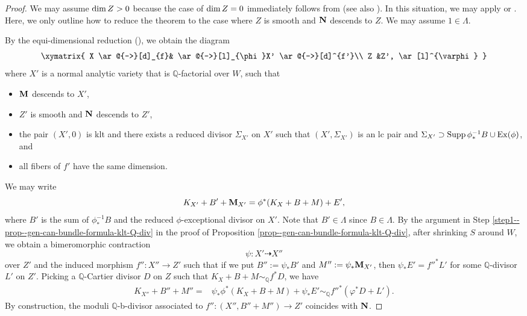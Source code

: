 \documentclass[12pt]{amsart}
\theoremstyle{definition}
\begin{document}
\begin{proof}
We may assume ${\rm dim}\,Z>0$ because the case of ${\rm dim}\,Z=0$ immediately follows from \cite[Theorem 1.2]{filipazzi-moraga} (see also \cite[Theorem 1.10]{birkar-compl}). 
In this situation, we may apply \cite[Proof of Proposition 6.3]{birkar-compl} or \cite[Section 5]{filipazzi-moraga}.  
Here, we only outline how to reduce the theorem to the case where $Z$ is smooth and $\boldsymbol{\rm N}$ descends to $Z$. 
We may assume $1 \in \Lambda$. 

By the equi-dimensional reduction (\cite{eh-semistablereduction}), we obtain the diagram
 $$
\xymatrix{
X \ar@{->}[d]_{f}& \ar@{->}[l]_{\phi}X' \ar@{->}[d]^{f'}\\
Z &Z', \ar[l]^{\varphi}
}
$$
where $X'$ is a normal analytic variety that is $\mathbb{Q}$-factorial over $W$, such that
\begin{itemize}
\item
$\boldsymbol{\rm M}$ descends to $X'$,
\item
$Z'$ is smooth and $\boldsymbol{\rm N}$ descends to $Z'$, 
\item
 the pair $(X',0)$ is klt and there exists a reduced divisor $\Sigma_{X'}$ on $X'$ such that  $(X',\Sigma_{X'})$ is an lc pair and $\Sigma_{X'}\supset {\rm Supp}\,\phi^{-1}_{*}B\cup {\rm Ex}(\phi)$, and
\item
all fibers of $f'$ have the same dimension. 
\end{itemize}
We may write
$$K_{X'}+B'+\boldsymbol{\rm M}_{X'}=\phi^{*}(K_{X}+B+M)+E',$$
where $B'$ is the sum of $\phi^{-1}_{*}B$ and the reduced $\phi$-exceptional divisor on $X'$. 
Note that $B' \in \Lambda$ since $B \in \Lambda$. 
By the argument in Step \ref{step1--prop--gen-can-bundle-formula-klt-Q-div} in the proof of Proposition \ref{prop--gen-can-bundle-formula-klt-Q-div}, after shrinking $S$ around $W$, we obtain a bimeromorphic contraction 
$$\psi \colon X' \dashrightarrow X''$$
over $Z'$ and the induced morphism $f'' \colon X'' \to Z'$ such that if we put $B'':=\psi_{*}B'$ and $M'':=\psi_{*}\boldsymbol{\rm M}_{X'}$, then 
$\psi_{*}E'=f''^{*}L'$
for some $\mathbb{Q}$-divisor $L'$ on $Z'$. 
Picking a $\mathbb{Q}$-Cartier divisor $D$ on $Z$ such that $K_{X}+B+M \sim_{\mathbb{Q}} f^{*}D$, we have 
\begin{equation*}
\begin{split}
K_{X''}+B''+M''=&\psi_{*}\phi^{*}(K_{X}+B+M)+\psi_{*}E'\sim_{\mathbb{Q}}f''^{*}(\varphi^{*}D+L').
\end{split}
\end{equation*}
By construction, the moduli $\mathbb{Q}$-b-divisor associated to $f'' \colon (X'',B''+M'') \to Z'$ coincides with $\boldsymbol{\rm N}$. 


\end{proof}
\end{document}
